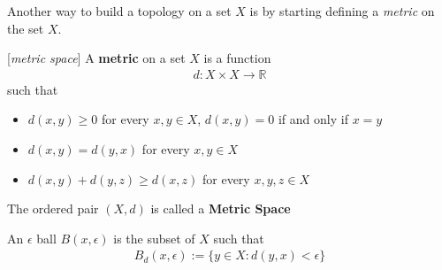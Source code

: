 Another way to build a topology on a set $X$ is by starting defining a \textit{metric} on the set $X$. 
\begin{definition}{[\textit{metric space}]}
	A \textbf{metric} on a set $X$ is a function
	\begin{align*}
	d : X \times X \rightarrow \mathbb{R} 
	\end{align*}
	such that
	\begin{itemize}
		\item $d(x,y) \geq 0$ for every $x, y \in X$, $d(x,y) = 0$ if and only if $x = y$
		\item $d(x,y) = d(y,x)$ for every $x, y \in X$
		\item $d(x,y) + d(y,z) \geq d(x,z)$ for every   $x, y, z \in X$
	\end{itemize}
	The ordered pair $(X,d)$ is called a \textbf{Metric Space}
	\label{def:metric}
\end{definition}

An $\epsilon$ ball $B(x, \epsilon)$ is the subset of $X$ such that
\begin{align*}
B_d(x, \epsilon) := \{y \in X: d(y,x)<\epsilon\}
\end{align*}

